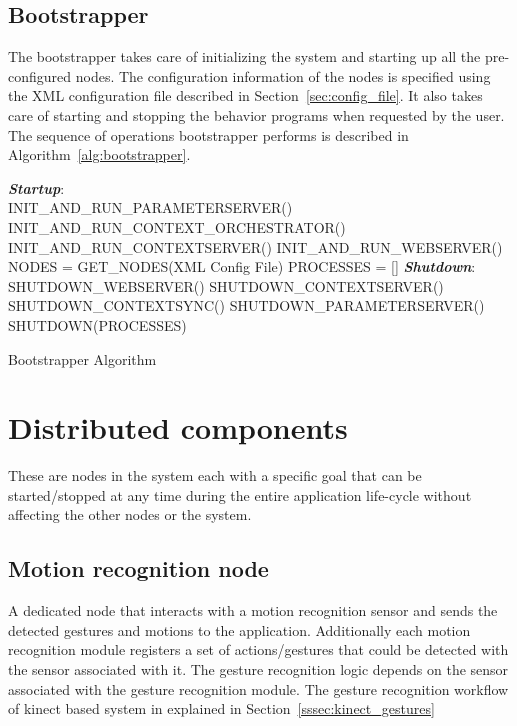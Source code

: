 \subsection*{Bootstrapper} 
The bootstrapper takes care of initializing the system and starting up all the pre-configured nodes. The configuration information of the nodes is specified using the XML configuration file described in Section~\ref{sec:config_file}. It also takes care of starting and stopping the behavior programs when requested by the user. The sequence of operations bootstrapper performs is described in Algorithm~\ref{alg:bootstrapper}.

\begin{algorithm}[H]
 \textbf{\emph{Startup}}:\\
 \quad INIT\_AND\_RUN\_PARAMETERSERVER()\;
 \quad INIT\_AND\_RUN\_CONTEXT\_ORCHESTRATOR()\;
 \quad INIT\_AND\_RUN\_CONTEXTSERVER()\;
 \quad INIT\_AND\_RUN\_WEBSERVER()\;
 \quad NODES = GET\_NODES(XML Config File)\;
 \quad PROCESSES = []\;
 \textbf{\emph{Shutdown}}:\\
 \quad SHUTDOWN\_WEBSERVER()\; 
 \quad SHUTDOWN\_CONTEXTSERVER()\;
 \quad SHUTDOWN\_CONTEXTSYNC()\;
 \quad SHUTDOWN\_PARAMETERSERVER()\;
 \quad SHUTDOWN(PROCESSES)
 \caption{Bootstrapper Algorithm}
 \label{alg:bootstrapper}
\end{algorithm}
\section{Distributed components}
\label{ssec:dist_comp}
These are nodes in the system each with a specific goal that can be started/stopped at any time during the entire application life-cycle without affecting the other nodes or the system.
\subsection{Motion recognition node} A dedicated node that interacts with a motion recognition sensor and sends the detected gestures and motions to the application. Additionally each motion recognition module registers a set of actions/gestures that could be detected with the sensor associated with it. The gesture recognition logic depends on the sensor associated with the gesture recognition module. The gesture recognition workflow of kinect based system in explained in Section~\ref{sssec:kinect_gestures}
